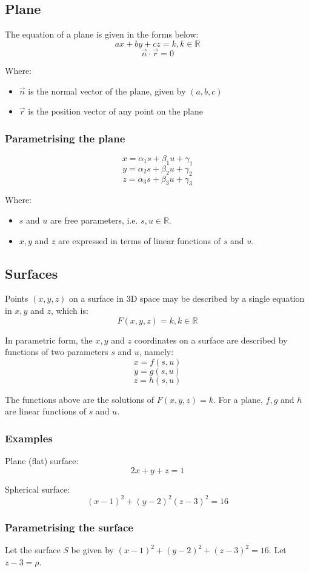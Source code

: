 \documentclass[11pt]{article}
\begin{document}
\subsection{Plane}
\label{sec:orgcae0bc4}
The equation of a plane is given in the forms below:
\[ax + by + cz = k, k \in \mathbb{R}\]
\[\vec{n} \cdot \vec{r} = 0\]

Where:
\begin{itemize}
\item \(\vec{n}\) is the normal vector of the plane, given by \((a, b, c)\)
\item \(\vec{r}\) is the position vector of any point on the plane
\end{itemize}
\subsubsection{Parametrising the plane}
\label{sec:orgd1568f0}
\[x = \alpha_1 s + \beta_1 u + \gamma_1\]
\[y = \alpha_2 s + \beta_2 u + \gamma_2\]
\[z = \alpha_3 s + \beta_3 u + \gamma_3\]

Where:
\begin{itemize}
\item \(s\) and \(u\) are free parameters, i.e. \(s, u \in \mathbb{R}\).
\item \(x, y\) and \(z\) are expressed in terms of linear functions of \(s\) and \(u\).
\end{itemize}
\subsection{Surfaces}
\label{sec:orgaba4ef7}
Points \((x, y, z)\) on a surface in 3D space may be described by a single equation in \(x, y\) and \(z\), which is:
\[F(x, y, z) = k, k \in \mathbb{R}\]

In parametric form, the \(x, y\) and \(z\) coordinates on a surface are described by functions of two parameters \(s\) and \(u\), namely:
\[x = f(s, u)\]
\[y = g(s, u)\]
\[z = h(s, u)\]

The functions above are the solutions of \(F(x, y, z) = k\). For a plane, \(f, g\) and \(h\) are linear functions of \(s\) and \(u\).
\subsubsection{Examples}
\label{sec:org9dcbdba}
Plane (flat) surface:
\[2x + y + z = 1\]

Spherical surface:
\[(x - 1)^2 + (y - 2)^2 (z - 3)^2 = 16\]
\subsubsection{Parametrising the surface}
\label{sec:orgab81051}
Let the surface \(S\) be given by \((x - 1)^2 + (y - 2)^2 + (z - 3)^2 = 16\). Let \(z - 3 = \rho\).
\end{document}
